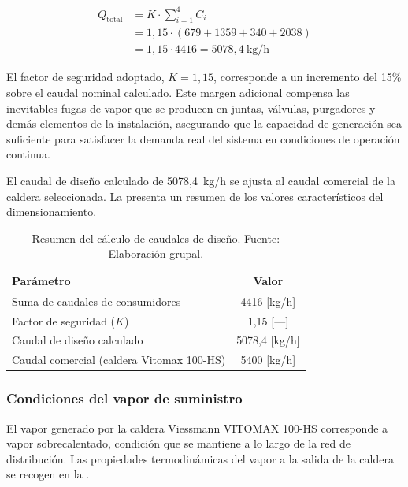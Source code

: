\documentclass[12pt]{article}
\begin{document}
\begin{equation}
	\begin{split}
		Q_{\text{total}} & = K \cdot \sum_{i=1}^{4} C_i                 \\
		                 & = 1{,}15 \cdot (679 + 1359 + 340 + 2038)     \\
		                 & = 1{,}15 \cdot 4416 = 5078{,}4 \ \text{kg/h}
	\end{split}
	\label{eq:caudal-total-diseno}
\end{equation}

El factor de seguridad adoptado, $K = 1{,}15$, corresponde a un incremento del 15\% sobre el caudal nominal calculado. Este margen adicional compensa las inevitables fugas de vapor que se producen en juntas, válvulas, purgadores y demás elementos de la instalación, asegurando que la capacidad de generación sea suficiente para satisfacer la demanda real del sistema en condiciones de operación continua.

El caudal de diseño calculado de 5078,4~kg/h se ajusta al caudal comercial de la caldera seleccionada. La  presenta un resumen de los valores característicos del dimensionamiento.

\begin{table}[H]
	\centering
	\caption{Resumen del cálculo de caudales de diseño. Fuente: Elaboración grupal.}
	\label{tab:resumen-caudales}
	\begin{tabular}{lc}
		\toprule
		\textbf{Parámetro}                        & \textbf{Valor} \\
		\midrule
		Suma de caudales de consumidores          & 4416 [kg/h]    \\
		Factor de seguridad ($K$)                 & 1,15 [---]     \\
		Caudal de diseño calculado                & 5078,4 [kg/h]  \\
		Caudal comercial (caldera Vitomax 100-HS) & 5400 [kg/h]    \\
		\bottomrule
	\end{tabular}
\end{table}

\subsubsection{Condiciones del vapor de suministro}

El vapor generado por la caldera Viessmann VITOMAX 100-HS corresponde a vapor sobrecalentado, condición que se mantiene a lo largo de la red de distribución. Las propiedades termodinámicas del vapor a la salida de la caldera se recogen en la .
\end{document}
